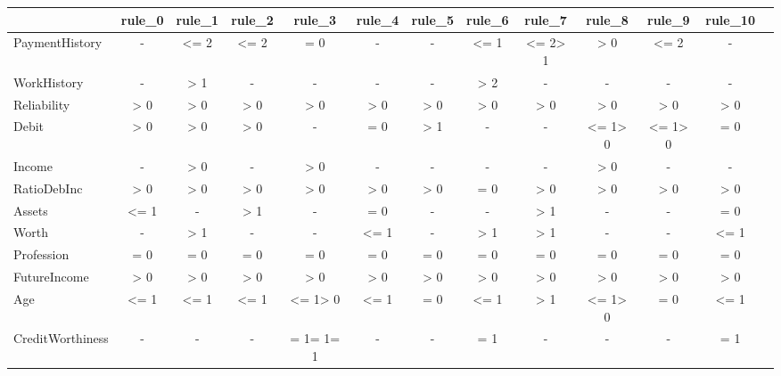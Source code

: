 \begin{tabular}{l|cccccccccccc}
\toprule
 & rule_0 & rule_1 & rule_2 & rule_3 & rule_4 & rule_5 & rule_6 & rule_7 & rule_8 & rule_9 & rule_10 \\
\midrule
PaymentHistory & - & <= 2 & <= 2 & = 0 & - & - & <= 1 & <= 2> 1 & > 0 & <= 2 & - \\
WorkHistory & - & > 1 & - & - & - & - & > 2 & - & - & - & - \\
Reliability & > 0 & > 0 & > 0 & > 0 & > 0 & > 0 & > 0 & > 0 & > 0 & > 0 & > 0 \\
Debit & > 0 & > 0 & > 0 & - & = 0 & > 1 & - & - & <= 1> 0 & <= 1> 0 & = 0 \\
Income & - & > 0 & - & > 0 & - & - & - & - & > 0 & - & - \\
RatioDebInc & > 0 & > 0 & > 0 & > 0 & > 0 & > 0 & = 0 & > 0 & > 0 & > 0 & > 0 \\
Assets & <= 1 & - & > 1 & - & = 0 & - & - & > 1 & - & - & = 0 \\
Worth & - & > 1 & - & - & <= 1 & - & > 1 & > 1 & - & - & <= 1 \\
Profession & = 0 & = 0 & = 0 & = 0 & = 0 & = 0 & = 0 & = 0 & = 0 & = 0 & = 0 \\
FutureIncome & > 0 & > 0 & > 0 & > 0 & > 0 & > 0 & > 0 & > 0 & > 0 & > 0 & > 0 \\
Age & <= 1 & <= 1 & <= 1 & <= 1> 0 & <= 1 & = 0 & <= 1 & > 1 & <= 1> 0 & = 0 & <= 1 \\
CreditWorthiness & - & - & - & = 1= 1= 1 & - & - & = 1 & - & - & - & = 1 \\
\bottomrule
\end{tabular}
